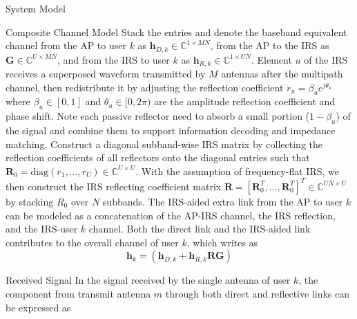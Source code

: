 \documentclass{IEEEtran}
\begin{document}
\begin{section} {System Model}
\begin{subsection} {Composite Channel Model}
            Stack the entries and denote the baseband equivalent channel from the AP to user $k$ as $\boldsymbol{h}_{D,k} \in \mathbb{C}^{1 \times MN}$, from the AP to the IRS as $\boldsymbol{G} \in \mathbb{C}^{U \times MN}$, and from the IRS to user $k$ as $\boldsymbol{h}_{R,k} \in \mathbb{C}^{1 \times UN}$. Element $u$ of the IRS receives a superposed waveform transmitted by $M$ antennas after the multipath channel, then redistribute it by adjusting the reflection coefficient $r_u = \beta_u e^{j \theta_u}$ where $\beta_u \in [0,1]$ and $\theta_u \in [0,2\pi)$ are the amplitude reflection coefficient and phase shift. Note each passive reflector need to absorb a small portion ($1 - \beta_u$) of the signal and combine them to support information decoding and impedance matching. Construct a diagonal subband-wise IRS matrix by collecting the reflection coefficients of all reflectors onto the diagonal entries such that $\boldsymbol{R}_0 = \text{diag}(r_1, \dots, r_U) \in \mathbb{C}^{U \times U}$. With the assumption of frequency-flat IRS, we then construct the IRS reflecting coefficient matrix $\boldsymbol{R} = [\boldsymbol{R}_0^T,\dots,\boldsymbol{R}_0^T]^T \in \mathbb{C}^{UN \times U}$ by stacking $R_0$ over $N$ subbands. The IRS-aided extra link from the AP to user $k$ can be modeled as a concatenation of the AP-IRS channel, the IRS reflection, and the IRS-user $k$ channel. Both the direct link and the IRS-aided link contributes to the overall channel of user $k$, which writes as
            \begin{equation} \label{eq:h_k}
                \boldsymbol{h}_k = \left( \boldsymbol{h}_{D,k}+\boldsymbol{h}_{R,k} \boldsymbol{R} \boldsymbol{G} \right)
            \end{equation}
        \end{subsection}

        \begin{subsection} {Received Signal}
            In the signal received by the single antenna of user $k$, the component from transmit antenna $m$ through both direct and reflective links can be expressed as


\end{subsection}
\end{section}
\end{document}
